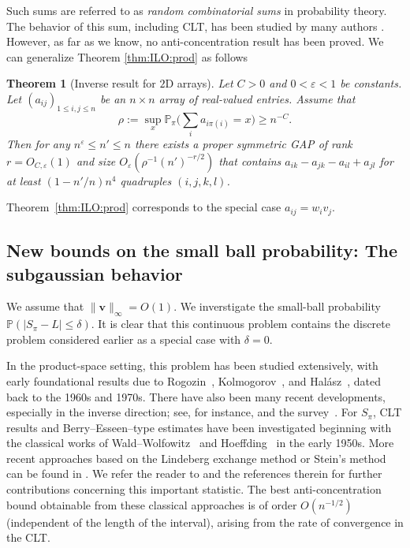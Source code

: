 \documentclass[reqno]{amsart}
\renewcommand\P{{\mathbb{P}}}
\newcommand\eps{{\varepsilon}}
\newcommand\BMv{{\bm v}}
\theoremstyle{plain}
\newtheorem{theorem}{Theorem}[section]
\theoremstyle{definition}
\begin{document}
Such sums are referred to as {\it random combinatorial sums} in probability theory. 
The behavior of this sum, including CLT, has been studied by many authors \cite{Bolt, ChenFang, HoChen, CGS,  Hoeffding, Roos-CLT}. However, as far as we know, no anti-concentration result has been proved.   We can generalize Theorem \ref{thm:ILO:prod} as follows

\begin{theorem}[Inverse result for $2$D arrays]\label{thm:ILO:array}
Let $C>0$ and $0<\eps<1$ be constants. Let $(a_{ij})_{1 \le i,j \le n}$ be an $n \times n$ array of real-valued entries. Assume that
\[
\rho := \sup_{x} \P_\pi\Big( \sum_i a_{i\pi(i)} = x \Big) \ge n^{-C}.
\]
Then for any $n^{\eps} \le n' \le n$ there exists a {proper symmetric} GAP of rank $r = O_{C, \eps}(1)$ and size $O_{\eps}(\rho^{-1}(n')^{-r/2})$ that contains $a_{i k} - a_{j k} - a_{i l} + a_{j l}$ for at least
$(1-n'/n)n^4$ quadruples $(i,j,k,l)$. 
\end{theorem}


Theorem~\ref{thm:ILO:prod} corresponds to the special case $a_{ij}=w_i v_j$.


\subsection{New bounds on the small ball probability: The subgaussian behavior}


We assume that $\|\BMv\|_{\infty}=O(1)$. 
We inverstigate the small-ball probability 
$\P (
|S_{\pi}-L|\le \delta)$. 
 It is clear that this continuous problem
 contains the discrete 
problem considered earlier as a special case
with $\delta=0$. 

In the product-space setting, this problem has been studied extensively, with
early foundational results due to Rogozin~\cite{Ro}, Kolmogorov~\cite{Kol}, and
Hal\'asz~\cite{Halasz}, dated back to the 1960s and 1970s. There have also been many recent developments, especially
in the inverse direction; see, for instance,
\cite{NgV-Adv, RV, TVinverse} and the survey~\cite{NVsur}.
For $S_{\pi}$, CLT results and Berry--Esseen--type
estimates have been investigated beginning with the classical works of
Wald--Wolfowitz~\cite{GN,WW} and Hoeffding~\cite{Hoeffding} in the early 1950s.
More recent approaches based on the Lindeberg exchange method or Stein’s method
can be found in
\cite{AChW, Bolt, ChenFang, HoChen, Roos-CLT}. We refer the reader to
\cite{CGS} and the references therein for further contributions concerning this
important statistic. The best anti-concentration bound obtainable from these
classical approaches is of order $O(n^{-1/2})$ (independent of the length of the
interval), arising from the rate of convergence in the CLT.
\end{document}
